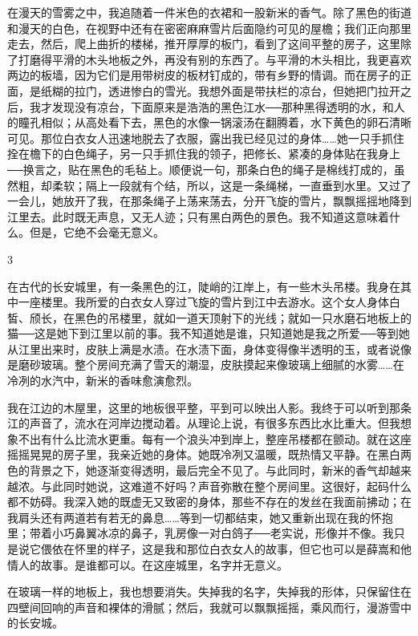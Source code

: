 在漫天的雪雾之中，我追随着一件米色的衣裙和一股新米的香气。除了黑色的街道和漫天的白色，在视野中还有在密密麻麻雪片后面隐约可见的屋檐；我们正向那里走去，然后，爬上曲折的楼梯，推开厚厚的板门，看到了这间平整的房子，这里除了打磨得平滑的木头地板之外，再没有别的东西了。与平滑的木头相比，我更喜欢两边的板墙，因为它们是用带树皮的板材钉成的，带有乡野的情调。而在房子的正面，是纸糊的拉门，透进惨白的雪光。我想外面是带扶栏的凉台，但她把门拉开之后，我才发现没有凉台，下面原来是浩浩的黑色江水──那种黑得透明的水，和人的瞳孔相似；从高处看下去，黑色的水像一锅滚汤在翻腾着，水下黄色的卵石清晰可见。那位白衣女人迅速地脱去了衣服，露出我已经见过的身体……她一只手抓住拴在檐下的白色绳子，另一只手抓住我的领子，把修长、紧凑的身体贴在我身上──换言之，贴在黑色的毛毡上。顺便说一句，那条白色的绳子是棉线打成的，虽然粗，却柔软；隔上一段就有个结，所以，这是一条绳梯，一直垂到水里。又过了一会儿，她放开了我，在那条绳子上荡来荡去，分开飞旋的雪片，飘飘摇摇地降到江里去。此时既无声息，又无人迹；只有黑白两色的景色。我不知道这意味着什么。但是，它绝不会毫无意义。 

3 

在古代的长安城里，有一条黑色的江，陡峭的江岸上，有一些木头吊楼。我身在其中一座楼里。我所爱的白衣女人穿过飞旋的雪片到江中去游水。这个女人身体白皙、颀长，在黑色的吊楼里，就如一道天顶射下的光线；就如一只水磨石地板上的猫──这是她下到江里以前的事。我不知道她是谁，只知道她是我之所爱──等到她从江里出来时，皮肤上满是水渍。在水渍下面，身体变得像半透明的玉，或者说像是磨砂玻璃。整个房间充满了雪天的潮湿，皮肤摸起来像玻璃上细腻的水雾……在冷冽的水汽中，新米的香味愈演愈烈。 

我在江边的木屋里，这里的地板很平整，平到可以映出人影。我终于可以听到那条江的声音了，流水在河岸边搅动着。从理论上说，有很多东西比水比重大。但我想象不出有什么比流水更重。每有一个浪头冲到岸上，整座吊楼都在颤动。就在这座摇摇晃晃的房子里，我亲近她的身体。她既冷冽又温暖，既热情又平静。在黑白两色的背景之下，她逐渐变得透明，最后完全不见了。与此同时，新米的香气却越来越浓。与此同时她说，这难道不好吗？声音弥散在整个房间里。这很好，起码什么都不妨碍。我深入她的既虚无又致密的身体，那些不存在的发丝在我面前拂动；在我肩头还有两道若有若无的鼻息……等到一切都结束，她又重新出现在我的怀抱里；带着小巧鼻翼冰凉的鼻子，乳房像一对白鸽子──老实说，形像并不像。我只是说它偎依在怀里的样子，这是我和那位白衣女人的故事，但它也可以是薛嵩和他情人的故事。是谁都可以。在这座城里，名字并无意义。 

在玻璃一样的地板上，我也想要消失。失掉我的名字，失掉我的形体，只保留住在四壁间回响的声音和裸体的滑腻；然后，我就可以飘飘摇摇，乘风而行，漫游雪中的长安城。 

